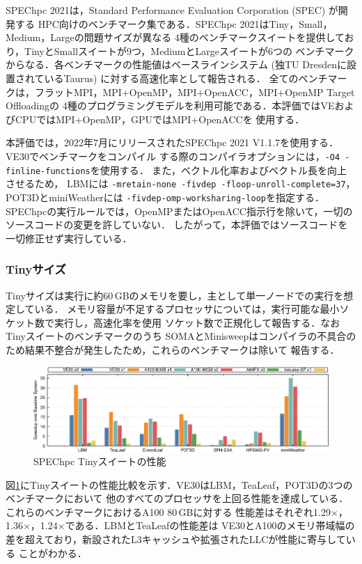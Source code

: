 ﻿\documentclass[submit,techrep,noauthor]{ipsj}
\begin{document}
SPEChpc 2021\cite{Li2022,Kodama2023}は，Standard Performance Evaluation Corporation (SPEC) が開発する
HPC向けのベンチマーク集である．SPEChpc 2021はTiny，Small，Medium，Largeの問題サイズが異なる
4種のベンチマークスイートを提供しており，TinyとSmallスイートが9つ，MediumとLargeスイートが6つの
ベンチマークからなる．各ベンチマークの性能値はベースラインシステム (独TU Dresdenに設置されているTaurus) 
に対する高速化率として報告される．
全てのベンチマークは，フラットMPI，MPI+OpenMP，MPI+OpenACC，MPI+OpenMP Target Offloadingの
4種のプログラミングモデルを利用可能である．本評価ではVEおよびCPUではMPI+OpenMP，GPUではMPI+OpenACCを
使用する．

本評価では，2022年7月にリリースされたSPEChpc 2021 V1.1.7を使用する．VE30でベンチマークをコンパイル
する際のコンパイラオプションには，\texttt{-O4 -finline-functions}を使用する．
また，ベクトル化率およびベクトル長を向上させるため，
LBMには \texttt{-mretain-none -fivdep -floop-unroll-complete=37}，
POT3DとminiWeatherには \texttt{-fivdep-omp-worksharing-loop}を指定する．
SPEChpcの実行ルールでは，OpenMPまたはOpenACC指示行を除いて，一切のソースコードの変更を許していない．
したがって，本評価ではソースコードを一切修正せず実行している．

\subsubsection{Tinyサイズ}

Tinyサイズは実行に約60\,GBのメモリを要し，主として単一ノードでの実行を想定している．
メモリ容量が不足するプロセッサについては，実行可能な最小ソケット数で実行し，高速化率を使用
ソケット数で正規化して報告する．なおTinyスイートのベンチマークのうち
SOMAとMinisweepはコンパイラの不具合のため結果不整合が発生したため，これらのベンチマークは除いて
報告する．

\begin{figure}[tb]
  \centering
  \includegraphics{figs/spechpc_tiny.pdf}
  \caption{SPEChpc Tinyスイートの性能}\label{fig:spechpc-t}
\end{figure}

図\ref{fig:spechpc-t}にTinyスイートの性能比較を示す．VE30はLBM，TeaLeaf，POT3Dの3つのベンチマークにおいて
他のすべてのプロセッサを上回る性能を達成している．これらのベンチマークにおけるA100 80\,GBに対する
性能差はそれぞれ1.29$\times$，1.36$\times$，1.24$\times$である．LBMとTeaLeafの性能差は
VE30とA100のメモリ帯域幅の差を超えており，新設されたL3キャッシュや拡張されたLLCが性能に寄与している
ことがわかる．
\end{document}

